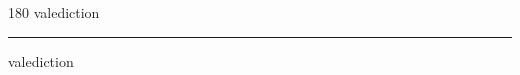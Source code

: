 
\begin{frame}
\begin{center}
\begin{turn}{180}
{\fontsize{2.5cm}{1em}\selectfont valediction}
\end{turn}
\vspace{1em}\par  
\hrule
\vspace{1em}\par  
{\fontsize{2.5cm}{1em}\selectfont valediction}
\end{center}
\end{frame}
